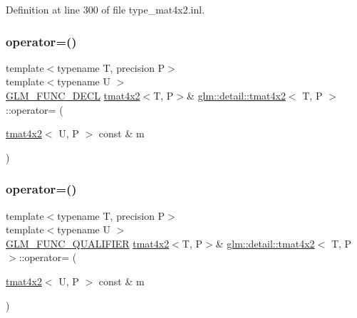 Definition at line 300 of file type\+\_\+mat4x2.\+inl.

\mbox{\label{structglm_1_1detail_1_1tmat4x2_a520ecb4fc8ff7b87e517db74d07678a7}} 
\subsubsection{\texorpdfstring{operator=()}{operator=()}\hspace{0.1cm}{\footnotesize\ttfamily [2/3]}}
{\footnotesize\ttfamily template$<$typename T, precision P$>$ \\
template$<$typename U $>$ \\
\hyperlink{setup_8hpp_ab2d052de21a70539923e9bcbf6e83a51}{G\+L\+M\+\_\+\+F\+U\+N\+C\+\_\+\+D\+E\+CL} \hyperlink{structglm_1_1detail_1_1tmat4x2}{tmat4x2}$<$T, P$>$\& \hyperlink{structglm_1_1detail_1_1tmat4x2}{glm\+::detail\+::tmat4x2}$<$ T, P $>$\+::operator= (\begin{DoxyParamCaption}\item[{\hyperlink{structglm_1_1detail_1_1tmat4x2}{tmat4x2}$<$ U, P $>$ const \&}]{m }\end{DoxyParamCaption})}

\mbox{\label{structglm_1_1detail_1_1tmat4x2_a2944e0d88d5337848dc71a591f6769e4}} 
\subsubsection{\texorpdfstring{operator=()}{operator=()}\hspace{0.1cm}{\footnotesize\ttfamily [3/3]}}
{\footnotesize\ttfamily template$<$typename T, precision P$>$ \\
template$<$typename U $>$ \\
\hyperlink{setup_8hpp_a33fdea6f91c5f834105f7415e2a64407}{G\+L\+M\+\_\+\+F\+U\+N\+C\+\_\+\+Q\+U\+A\+L\+I\+F\+I\+ER} \hyperlink{structglm_1_1detail_1_1tmat4x2}{tmat4x2}$<$T, P$>$\& \hyperlink{structglm_1_1detail_1_1tmat4x2}{glm\+::detail\+::tmat4x2}$<$ T, P $>$\+::operator= (\begin{DoxyParamCaption}\item[{\hyperlink{structglm_1_1detail_1_1tmat4x2}{tmat4x2}$<$ U, P $>$ const \&}]{m }\end{DoxyParamCaption})}



